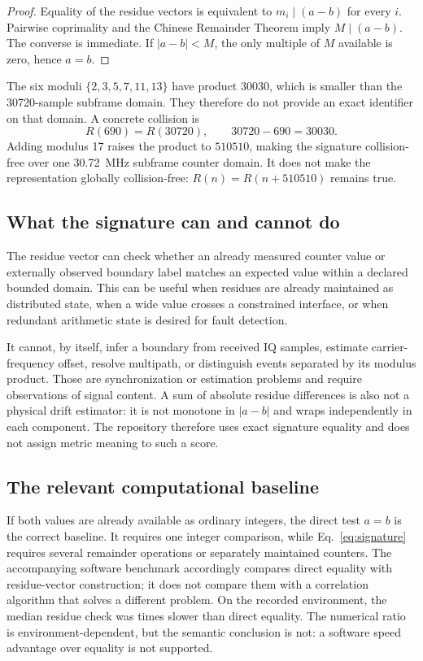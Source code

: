 \documentclass[11pt]{article}
\begin{document}
\begin{proof}
Equality of the residue vectors is equivalent to $m_i\mid(a-b)$ for every $i$.  Pairwise coprimality and the Chinese Remainder Theorem imply $M\mid(a-b)$.  The converse is immediate.  If $|a-b|<M$, the only multiple of $M$ available is zero, hence $a=b$.
\end{proof}

The six moduli $\{2,3,5,7,11,13\}$ have product $30030$, which is smaller than the 30720-sample subframe domain.  They therefore do not provide an exact identifier on that domain.  A concrete collision is
\begin{equation}
    R(690)=R(30720),\qquad 30720-690=30030.
\end{equation}
Adding modulus 17 raises the product to $510510$, making the signature collision-free over one 30.72~MHz subframe counter domain.  It does not make the representation globally collision-free: $R(n)=R(n+510510)$ remains true.

\subsection{What the signature can and cannot do}

The residue vector can check whether an already measured counter value or externally observed boundary label matches an expected value within a declared bounded domain.  This can be useful when residues are already maintained as distributed state, when a wide value crosses a constrained interface, or when redundant arithmetic state is desired for fault detection.

It cannot, by itself, infer a boundary from received IQ samples, estimate carrier-frequency offset, resolve multipath, or distinguish events separated by its modulus product.  Those are synchronization or estimation problems and require observations of signal content.  A sum of absolute residue differences is also not a physical drift estimator: it is not monotone in $|a-b|$ and wraps independently in each component.  The repository therefore uses exact signature equality and does not assign metric meaning to such a score.

\subsection{The relevant computational baseline}

If both values are already available as ordinary integers, the direct test $a=b$ is the correct baseline.  It requires one integer comparison, while Eq.~\eqref{eq:signature} requires several remainder operations or separately maintained counters.  The accompanying software benchmark accordingly compares direct equality with residue-vector construction; it does not compare them with a correlation algorithm that solves a different problem.  On the recorded environment, the median residue check was  times slower than direct equality.  The numerical ratio is environment-dependent, but the semantic conclusion is not: a software speed advantage over equality is not supported.
\end{document}

